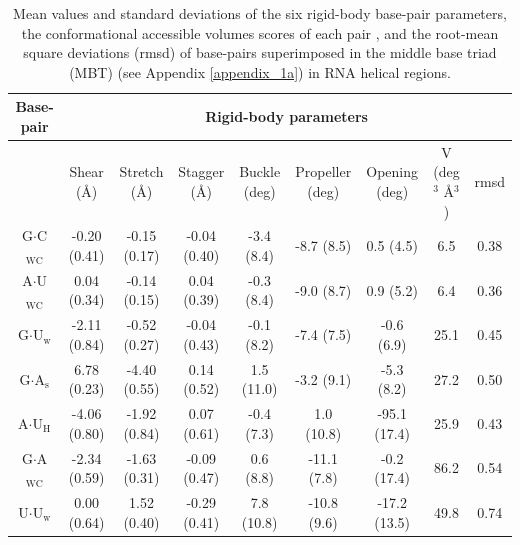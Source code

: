 \begin{table}
\begin{center}
\begin{tabular}{|c|c|c|c|c|c|c|c|c|}
\hline
Base-pair & \multicolumn{8}{c|}{Rigid-body parameters} \\
\hline
 & Shear (\AA) & Stretch (\AA) & Stagger (\AA) & Buckle (deg) &
Propeller (deg) & Opening (deg) & V (deg$^{\text{3}}$
\AA$^{\text{3}}$) & rmsd \\
\hline
G$\cdot$C$_{\text{WC}}$ & -0.20 (0.41) & -0.15 (0.17) & -0.04 (0.40) & -3.4 (8.4)  &  -8.7  (8.5) &  0.5  (4.5)  & 6.5   & 0.38\\
A$\cdot$U$_{\text{WC}}$ &  0.04 (0.34) & -0.14 (0.15) &  0.04 (0.39) & -0.3 (8.4)  &  -9.0  (8.7) &  0.9  (5.2)  & 6.4   & 0.36\\
G$\cdot$U$_{\text{w}}$  & -2.11 (0.84) & -0.52 (0.27) & -0.04 (0.43) & -0.1 (8.2)  &  -7.4  (7.5) & -0.6  (6.9)  & 25.1  & 0.45\\
G$\cdot$A$_{\text{s}}$  &  6.78 (0.23) & -4.40 (0.55) &  0.14 (0.52) &  1.5 (11.0) &  -3.2  (9.1) & -5.3  (8.2)  & 27.2  & 0.50\\
A$\cdot$U$_{\text{H}}$  & -4.06 (0.80) & -1.92 (0.84) &  0.07 (0.61) & -0.4 (7.3)  &   1.0 (10.8) & -95.1 (17.4) & 25.9  & 0.43\\
G$\cdot$A$_{\text{WC}}$ & -2.34 (0.59) & -1.63 (0.31) & -0.09 (0.47) &  0.6 (8.8)  & -11.1  (7.8) & -0.2  (17.4) & 86.2  & 0.54\\
U$\cdot$U$_{\text{w}}$  &  0.00 (0.64) &  1.52 (0.40) & -0.29 (0.41) &  7.8 (10.8) & -10.8  (9.6) & -17.2 (13.5) & 49.8  & 0.74\\
\hline
\end{tabular}
\caption{Mean  values and  standard deviations  of the  six rigid-body
  base-pair parameters,  the conformational accessible  volumes scores
  of each  pair \cite{olson1998},  and the root-mean  square deviations
  (rmsd)  of base-pairs superimposed  in the  middle base  triad (MBT)
  (see Appendix \ref{appendix_1a}) in RNA helical regions.}
\label{tab:bppar}
\end{center}
\end{table}




